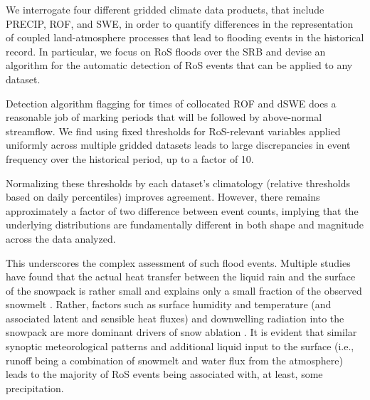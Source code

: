 \documentclass[nhess, manuscript]{copernicus}
\begin{document}
\conclusions

We interrogate four different gridded climate data products, that include PRECIP, ROF, and SWE, in order to quantify differences in the representation of coupled land-atmosphere processes that lead to flooding events in the historical record.
In particular, we focus on RoS floods over the SRB and devise an algorithm for the automatic detection of RoS events that can be applied to any dataset.

Detection algorithm flagging for times of collocated ROF and dSWE does a reasonable job of marking periods that will be followed by above-normal streamflow.
We find using fixed thresholds for RoS-relevant variables applied uniformly across multiple gridded datasets leads to large discrepancies in event frequency over the historical period, up to a factor of 10.

Normalizing these thresholds by each dataset's climatology (relative thresholds based on daily percentiles) improves agreement.
However, there remains approximately a factor of two difference between event counts, implying that the underlying distributions are fundamentally different in both shape and magnitude across the data analyzed.



This underscores the complex assessment of such flood events. Multiple studies have found that the actual heat transfer between the liquid rain and the surface of the snowpack is rather small and explains only a small fraction of the observed snowmelt \citep{moore1984controls}.
Rather, factors such as surface humidity and temperature (and associated latent and sensible heat fluxes) and downwelling radiation into the snowpack are more dominant drivers of snow ablation \citep{mazurkiewicz2008assessing,wurzer2016influence,harpold2018humidity}.
It is evident that similar synoptic meteorological patterns \citep{grote2021synoptic} and additional liquid input to the surface (i.e., runoff being a combination of snowmelt and water flux from the atmosphere) leads to the majority of RoS events being associated with, at least, some precipitation.
\end{document}
